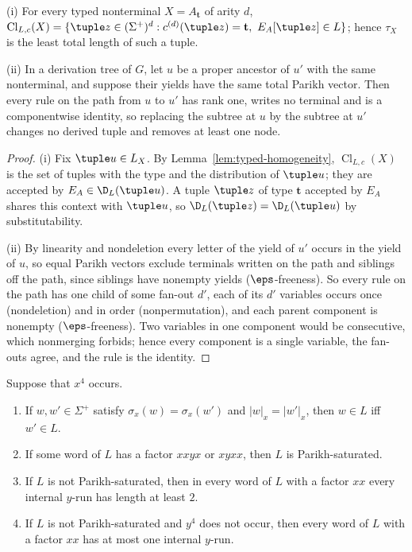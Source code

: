 \begin{lemma}\label{lem:app-two-basic}
\textup{(i)} For every typed nonterminal $X=A_{\mathbf t}$ of arity $d$,
$\operatorname{Cl}_{L,c}(X)=\{\tuple z\in(\Sigma^+)^d:c^{(d)}(\tuple z)=\mathbf t,\
E_A[\tuple z]\in L\}$; hence $\tau_X$ is the least total length of such a tuple.

\textup{(ii)} In a derivation tree of $G$, let $u$ be a proper ancestor of $u'$
with the same nonterminal, and suppose their yields have the same total Parikh
vector.  Then every rule on the path from $u$ to $u'$ has rank one, writes no
terminal and is a componentwise identity, so replacing the subtree at $u$ by the
subtree at $u'$ changes no derived tuple and removes at least one node.
\end{lemma}

\begin{proof}
(i) Fix $\tuple u\in L_X$.  By Lemma~\ref{lem:typed-homogeneity},
$\operatorname{Cl}_{L,c}(X)$ is the set of tuples with the type and the
distribution of $\tuple u$; they are accepted by $E_A\in\D_L(\tuple u)$.  A tuple
$\tuple z$ of type $\mathbf t$ accepted by $E_A$ shares this context with $\tuple u$,
so $\D_L(\tuple z)=\D_L(\tuple u)$ by substitutability.

(ii) By linearity and nondeletion every letter of the yield of $u'$ occurs in the
yield of $u$, so equal Parikh vectors exclude terminals written on the path
and siblings off the path, since siblings have nonempty yields
($\eps$-freeness).  So every rule on the path has one child of some fan-out
$d'$, each of its $d'$ variables occurs once (nondeletion) and in order
(nonpermutation), and each parent component is nonempty ($\eps$-freeness).
Two variables in one component would be consecutive, which nonmerging forbids;
hence every component is a single variable, the fan-outs agree, and the rule is
the identity.
\end{proof}

\begin{lemma}[Run exchanges]\label{lem:app-two-runs}
Suppose that $x^4$ occurs.
\begin{enumerate}[label=\textup{(\roman*)},leftmargin=*]
\item If $w,w'\in\Sigma^+$ satisfy $\sigma_x(w)=\sigma_x(w')$ and
$|w|_x=|w'|_x$, then $w\in L$ iff $w'\in L$.
\item If some word of $L$ has a factor $xxyx$ or $xyxx$, then $L$ is
Parikh-saturated.
\item If $L$ is not Parikh-saturated, then in every word of $L$ with a factor
$xx$ every internal $y$-run has length at least $2$.
\item If $L$ is not Parikh-saturated and $y^4$ does not occur, then every word
of $L$ with a factor $xx$ has at most one internal $y$-run.
\end{enumerate}
\end{lemma}

